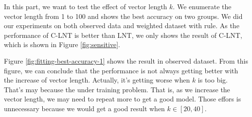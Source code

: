 In this part, we want to test the effect of vector length $k$. We enumerate the vector length from 1 to 100 and shows the best accuracy on two groups. We did our experiments on both observed data and weighted dataset with rule. As the performance of C-LNT is better than LNT, we only shows the result of C-LNT, which is shown in Figure \ref{fig:sensitive}.

Figure \ref{fig:fitting-best-accuracy-1} shows the result in observed dataset.
From this figure, we can conclude that the performance is not always getting better with the increase of vector length. Actually, it's getting worse when $k$ is too big. That's may because the under training problem. That is, as we increase the vector length, we may need to repeat more to get a good model. Those effors is unnecessary because we would get a good result when $k \in [20,40]$.
